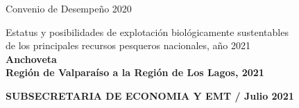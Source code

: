\documentclass[12pt, oneside]{article} %
\begin{document}
\begin{titlepage}
\centering \fontsize{9pt}{8pt}\selectfont
            \vspace*{-3mm} 
            \hfill Convenio de Desempeño 2020 
            
\centering \fontsize{9pt}{8pt}\selectfont
            \vspace*{-16mm} 
            \hfill \begin{flushright}
            Estatus y posibilidades de explotación biológicamente  sustentables \\ de los principales recursos pesqueros nacionales, año 2021 \\
            \vspace*{5mm} 
            \hfill \textbf{Anchoveta \\ Región de Valparaíso a la Región de Los Lagos, 2021} 
              \end{flushright} 
            \vspace*{-5mm} 
            \hfill \textbf{SUBSECRETARIA DE ECONOMIA Y EMT / Julio 2021}



\end{titlepage}
\end{document}
